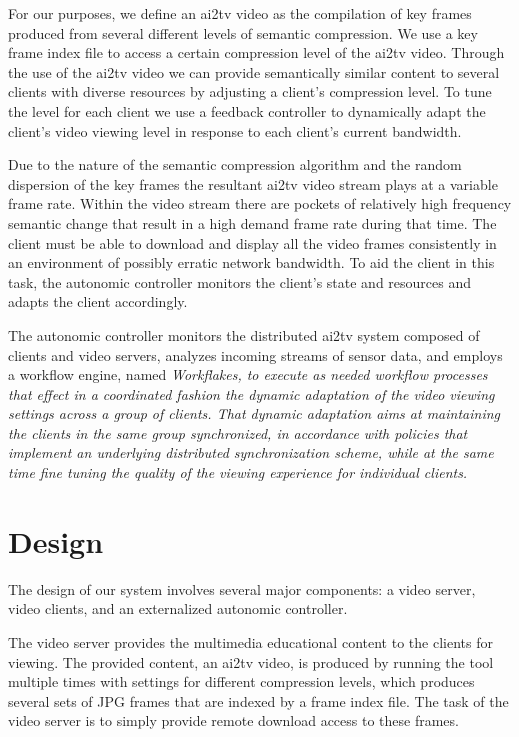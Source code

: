 \documentclass{sig-alternate}
\begin{document}
For our purposes, we define an ai2tv video as the
compilation of key frames produced from several different levels of
semantic compression.  We use a key frame index file to access a
certain compression level of the ai2tv video.  Through the
use of the ai2tv video we can provide semantically similar
content to several clients with diverse resources by adjusting a
client's compression level.  To tune the level for each client we use
a feedback controller to dynamically adapt the client's video viewing
level in response to each client's current bandwidth.

Due to the nature of the semantic compression algorithm and the random
dispersion of the key frames the resultant ai2tv video stream plays at
a variable frame rate.  Within the video stream there are pockets of
relatively high frequency semantic change that result in a high demand
frame rate during that time.  The client must be able to download and
display all the video frames consistently in an environment of
possibly erratic network bandwidth.  To aid the client in this task,
the autonomic controller monitors the client's state and resources and
adapts the client accordingly.

The autonomic controller monitors the distributed ai2tv system
composed of clients and video servers, analyzes incoming streams of
sensor data, and employs a workflow engine, named
\em{Workflakes}\cite{PEPPO}, to execute as needed workflow processes
that effect in a coordinated fashion the \em{dynamic adaptation} of
the video viewing settings across a group of clients.  That dynamic
adaptation aims at maintaining the clients in the same group
synchronized, in accordance with policies that implement an underlying
distributed synchronization scheme, while at the same time fine tuning
the quality of the viewing experience for individual clients.

\section{Design} \label{design}

The design of our system involves several major components: a video
server, video clients, and an externalized autonomic controller.

%

The video server provides the multimedia educational content to the
clients for viewing.  The provided content, an ai2tv video, is
produced by running the tool multiple times with settings for
different compression levels, which produces several sets of JPG
frames that are indexed by a frame index file.  The task of the video
server is to simply provide remote download access to these frames.
\end{document}
